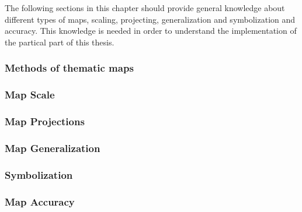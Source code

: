 The following sections in this chapter should provide general knowledge about different types of maps, scaling, projecting, generalization and symbolization and accuracy. This knowledge is needed in order to understand the implementation of the partical part of this thesis.

\subsubsection{Methods of thematic maps}


\subsubsection{Map Scale}
\label{s:map-scale}


\subsubsection{Map Projections}

\label{s:map-projections}

\subsubsection{Map Generalization}


\subsubsection{Symbolization}

\subsubsection{Map Accuracy}
\label{s:map-accuracy}
